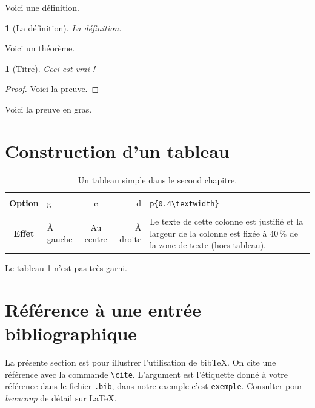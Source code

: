 \documentclass[12pt,twoside,maitrise]{dms}
\newtheorem{deff}[cor]{\definitionname}
\newtheorem{theo}[cor]{\theoremname}
\theoremstyle{definition}
\numberwithin{equation}{section}
\numberwithin{table}{chapter}
\numberwithin{figure}{chapter}
\begin{document}
Voici une définition.
\begin{deff}[La définition]
    La définition.
\end{deff}
Voici un théorème.
\begin{theo}[Titre]
    Ceci est vrai !
\end{theo}
\begin{proof}
    Voici la preuve.
\end{proof}
\begin{demo}
    Voici la preuve en gras.
\end{demo}

\section{Construction d'un tableau}

\begin{table}[htb]
    \centering
    \begin{tabular}{|c||l|c|r|p{}|}
        \hline            &            &            &            &                                                                                                                            \\
        \textbf{Option}    & g            & c            & d            & \verb|p{0.4\textwidth}|                                                                                                    \\[3mm]
        \hline\hline    &            &            &            &                                                                                                                            \\
        \textbf{Effet}    & À gauche    & Au centre    & À droite    & Le texte de cette colonne est justifié et la largeur de la colonne est fixée à 40\,\% de la zone de texte (hors tableau).    \\[3mm]
        \hline
    \end{tabular}
    \caption{Un tableau simple dans le second chapitre.}
    \label{tab:simple2}
\end{table}
Le tableau \ref{tab:simple2} n'est pas très garni.

\section{Référence à une entrée bibliographique}

La présente section est pour illustrer l'utilisation de
bib\TeX. On cite une référence avec la commande \verb|\cite|.
L'argument est l'étiquette donné à votre référence dans
le fichier \texttt{.bib}, dans notre exemple c'est \texttt{exemple}.
Consulter \cite{exemple} pour \textit{beaucoup} de détail sur \LaTeX.
\end{document}
